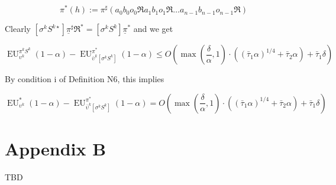 \documentclass[a4paper]{article}
\newcommand{\AP}[1]{\left(#1\right)}
\newcommand{\AB}[1]{\left[#1\right]}
\newcommand{\EU}{\operatorname{EU}}
\begin{document}
$$\pi^*(h) := \pi^\sharp\AP{a_0 b_0 o_0 \Re a_1 b_1 o_1 \Re \ldots a_{n-1} b_{n-1} o_{n-1} \Re}$$

Clearly $\AB{\sigma^k S^{k\star}}\underline{\pi}^\sharp\Re^* = \AB{\sigma^k S^{k}}\underline{\pi}^*$ and we get

$$\EU_{\upsilon^k}^{\pi^k S^{k}}(1-\alpha)-\EU_{\bar{\upsilon}^k\AB{\sigma^k S^{k}}}^{\pi^*}(1-\alpha) \leq O\AP{\max\AP{\frac{\delta}{\alpha},1}\cdot\AP{(\bar{\tau}_1 \alpha)^{1/4} + \bar{\tau}_2 \alpha}+\bar{\tau}_1\delta}$$

By condition i of Definition N6, this implies

$$\EU_{\upsilon^k}^{*}(1-\alpha)-\EU_{\bar{\upsilon}^k\AB{\sigma^k S^{k}}}^{\pi^*}(1-\alpha) = O\AP{\max\AP{\frac{\delta}{\alpha},1}\cdot\AP{(\bar{\tau}_1 \alpha)^{1/4} + \bar{\tau}_2 \alpha}+\bar{\tau}_1\delta}$$

\section{Appendix B}

TBD
\end{document}
